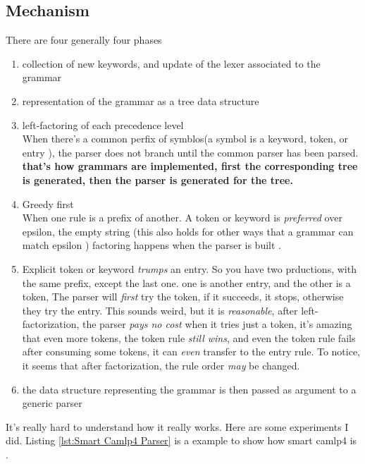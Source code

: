 \subsection{Mechanism}
  There are four generally four phases
  \begin{enumerate}[I]
  \item collection of new keywords, and update of the lexer associated
    to the grammar
  \item representation of the grammar as a tree data structure
  \item left-factoring of each precedence level \\
    When there's a common perfix of symblos(a symbol is a keyword,
    token, or entry ), the parser does not branch until the common parser
    has been parsed. \textbf{that's how grammars are implemented, first the
      corresponding tree is generated, then the parser is generated for
      the tree.}
  \item Greedy first \\
    When one rule is a prefix of another.  A token or keyword is
    \textit{preferred} over epsilon, the empty string (this also holds for
    other ways that a grammar can match epsilon ) factoring happens
    when the parser is built .
  \item Explicit token or keyword \textit{trumps} an entry. So you
    have two prductions, with the same prefix, except the last
    one. one is another entry, and the other is a token, The parser
    will \textit{first} try the token, if it succeeds, it stops,
    otherwise they try the entry. This sounds weird, but it is
    \textit{reasonable}, after left-factorization, the parser
    \textit{pays no cost} when it tries just a token, it's amazing
    that even more tokens, the token rule \textit{still wins}, and
    even the token rule fails after consuming some tokens, it can
    \textit{even} transfer to the entry rule.  To notice, it seems
    that after  factorization, the rule order \textit{may} be changed.
  \item the data structure representing the grammar is then passed as
    argument to a generic parser
  \end{enumerate}

  It's really hard to understand how it really works. Here are some
  experiments I did. Listing \ref{lst:Smart Camlp4 Parser} is a
  example to show how smart camlp4 is .


  \inputminted[fontsize=\scriptsize]{ocaml}{code/camlp4/airth/second.ml}




